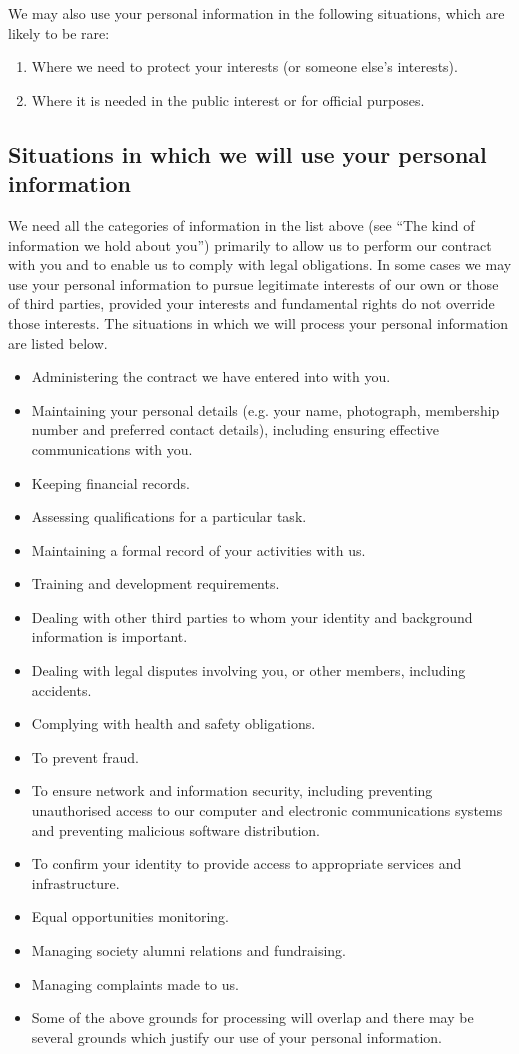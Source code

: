 \documentclass[12pt]{article}
\begin{document}
We may also use your personal information in the following situations, which are likely to be rare:

\begin{enumerate}
\item Where we need to protect your interests (or someone else's interests).
\item Where it is needed in the public interest or for official purposes.
\end{enumerate}

\subsection{Situations in which we will use your personal information}

We need all the categories of information in the list above (see “The kind of information we hold about you”) primarily to allow us to perform our contract with you and to enable us to comply with legal obligations. In some cases we may use your personal information to pursue legitimate interests of our own or those of third parties, provided your interests and fundamental rights do not override those interests. The situations in which we will process your personal information are listed below. 

\begin{itemize}
\item Administering the contract we have entered into with you.
\item Maintaining your personal details (e.g. your name, photograph, membership number and preferred contact details), including ensuring effective communications with you.
\item Keeping financial records.
\item Assessing qualifications for a particular task.
\item Maintaining a formal record of your activities with us.
\item Training and development requirements.
\item Dealing with other third parties to whom your identity and background information is important. 
\item Dealing with legal disputes involving you, or other members, including accidents.
\item Complying with health and safety obligations.
\item To prevent fraud.
\item To ensure network and information security, including preventing unauthorised access to our computer and electronic communications systems and preventing malicious software distribution.
\item To confirm your identity to provide access to appropriate services and infrastructure.
\item Equal opportunities monitoring.
\item Managing society alumni relations and fundraising.
\item Managing complaints made to us.
\item Some of the above grounds for processing will overlap and there may be several grounds which justify our use of your personal information. 
\end{itemize}
\end{document}
